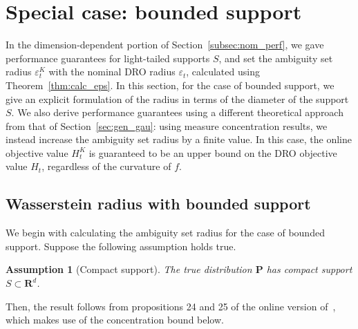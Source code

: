 \documentclass[12pt]{article}
\newcommand{\prob}{{\mathbf P}}
\newcommand{\supp}{S}
\newcommand{\unc}{u}
\newcommand{\eps}{\varepsilon^K}
\newcommand{\epsnom}{\varepsilon}
\newtheorem{assumption}{Assumption}[section]
\begin{document}
\ifpreprint
\section{Special case: bounded support}
\label{sec:bounded_perf}
In the dimension-dependent portion of Section~\ref{subsec:nom_perf}, we gave performance guarantees for light-tailed supports $S$, and set the ambiguity set radius $\eps_t$ with the nominal \gls{DRO} radius $\epsnom_t$, calculated using Theorem~\ref{thm:calc_eps}. 
In this section, for the case of bounded support, we give an explicit formulation of the radius in terms of the diameter of the support $S$. 
We also derive performance guarantees using a different theoretical approach from that of Section~\ref{sec:gen_gau}: using measure concentration results, we instead increase the ambiguity set radius by a finite value. In this case, the online objective value $H^K_t$ is guaranteed to be an upper bound on the \gls{DRO} objective value $H_t$, regardless of the curvature of $f$.



\subsection{Wasserstein radius with bounded support}
\label{sec:static_set}
We begin with calculating the ambiguity set radius for the case of bounded support. 
Suppose the following assumption holds true.
\begin{assumption}[Compact support]\label{ass:noise}
The true distribution $\mathbf{P}$ has compact support $\supp \subset \mathbf{R}^d$.
\end{assumption}
Then, the result follows from propositions 24 and 25 of the online version of~\cite{bounded_wass}, which makes use of the concentration bound below. 
\end{document}
